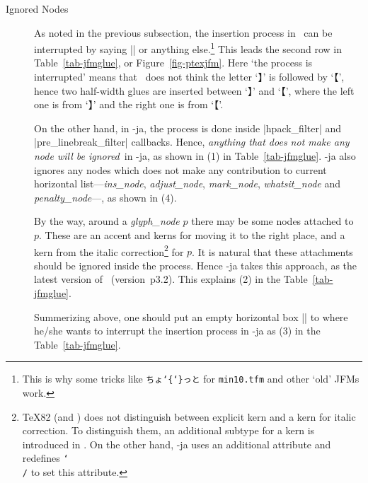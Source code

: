\documentclass{ajt}
\begin{document}
\begin{description}
\item[Ignored Nodes]
As noted in the previous subsection, the insertion process in \pTeX\ can
	   be interrupted by saying |{}| or anything else.\footnote{This
	   is why some tricks like \texttt{ちょ\char`\{\char`\}っと} for
	   \texttt{min10.tfm} and other `old' JFMs work.} This leads the
	   second row in Table~\ref{tab-jfmglue}, or
	   Figure~\ref{fig-ptexjfm}. Here `the process is interrupted'
	   means that \pTeX\ does not think the letter `】\inhibitglue'
	   is followed by `\inhibitglue【', hence two half-width glues
	   are inserted between `】\inhibitglue' and `\inhibitglue【',
	   where the left one is from `】\inhibitglue' and the right one
	   is from `\inhibitglue【'.

	   On the other hand, in \LuaTeX-ja, the process is done inside
	   |hpack_filter| and |pre_linebreak_filter| callbacks. Hence,
	   \emph{anything that does not make any node will be
	   ignored}\ in \LuaTeX-ja, as shown in (1) in
	   Table~\ref{tab-jfmglue}. \LuaTeX-ja also ignores any nodes
	   which does not make any contribution to current horizontal
	   list---\emph{ins\_node}, \emph{adjust\_node},
	   \emph{mark\_node}, \emph{whatsit\_node} and
	   \emph{penalty\_node}---, as shown in (4).


By the way, around a \emph{glyph\_node} $p$ there may be some nodes
	   attached to~$p$. These are an accent and kerns for
	   moving it to the right place, and a kern from the italic
	   correction\footnote{\TeX82 (and \LuaTeX) does not distinguish
	   between explicit kern and a kern for italic correction. To
	   distinguish them, an additional subtype for a kern is introduced
	   in \pTeX. On the other hand, \LuaTeX-ja uses an additional attribute and
	   redefines \texttt{\char`\\/} to set this attribute.} for $p$. It is natural that
	   these attachments should be ignored inside the process. Hence
	   \LuaTeX-ja takes this approach, as the latest version of
	   \pTeX\ (version~p3.2). This explains (2) in the Table~\ref{tab-jfmglue}.

Summerizing above, one should put an empty horizontal box |\hbox{}| to
	   where he/she wants to interrupt the insertion process in
	   \LuaTeX-ja as (3) in the Table~\ref{tab-jfmglue}.


\end{description}
\end{document}
